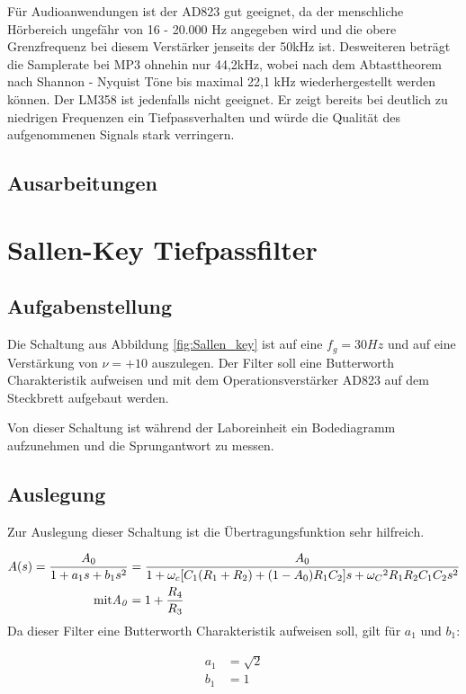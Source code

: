 Für Audioanwendungen ist der AD823 gut geeignet, da der menschliche Hörbereich ungefähr von 16 - 20.000 Hz angegeben wird und die obere Grenzfrequenz bei diesem Verstärker jenseits der 50kHz ist.  Desweiteren beträgt die Samplerate bei MP3 ohnehin nur 44,2kHz, wobei nach dem Abtasttheorem nach Shannon - Nyquist Töne bis maximal 22,1 kHz wiederhergestellt werden können. Der LM358 ist jedenfalls nicht geeignet. Er zeigt bereits bei deutlich zu niedrigen Frequenzen ein Tiefpassverhalten und würde die Qualität des aufgenommenen Signals stark verringern. 
\subsection{Ausarbeitungen}

\section{Sallen-Key Tiefpassfilter}
\subsection{Aufgabenstellung}
Die Schaltung aus Abbildung \ref{fig:Sallen_key} ist auf eine $f_g=30Hz$ und auf eine Verstärkung von $\nu = +10$ auszulegen. Der Filter soll eine Butterworth Charakteristik aufweisen und mit dem Operationsverstärker AD823 auf dem Steckbrett aufgebaut werden.

Von dieser Schaltung ist während der Laboreinheit ein Bodediagramm aufzunehmen und die Sprungantwort zu messen.


\subsection{Auslegung}
Zur Auslegung dieser Schaltung ist die Übertragungsfunktion \cite[212]{10.5555/3158302} sehr hilfreich.

\begin{align}
    A(s) = \frac{A_0}{1+a_1s + b_1s^2}&=\frac{A_0}{1+\omega_c[C_1(R_1+R_2) + (1-A_0)R_1C_2]s + {\omega_C}^2R_1R_2C_1C_2s^2} \\
    \rm mit \it A_0 &= 1+ \frac{R_4}{R_3} 
\end{align}
Da dieser Filter eine Butterworth Charakteristik aufweisen soll, gilt für $a_1$ und $b_1$:

\begin{align}
    a_1 &= \sqrt{2} \\
    b_1 &= 1
\end{align}

